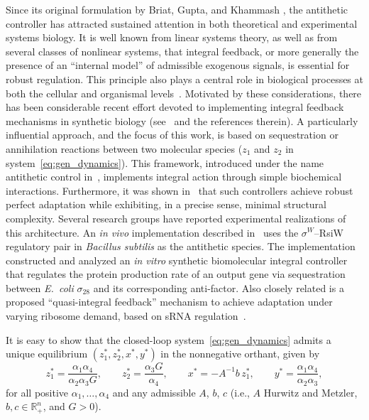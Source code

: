 \documentclass{article}
\begin{document}
Since its original formulation by Briat, Gupta, and Khammash \cite{AFC2016}, the antithetic controller has attracted sustained attention in both theoretical and experimental systems biology.
%
It is well known from linear systems theory, as well as from several classes of nonlinear systems, that integral feedback, or more generally the presence of an ``internal model'' of admissible exogenous signals, is essential for robust regulation. This principle also plays a central role in biological processes at both the cellular and organismal levels~\cite{rev_internal_model_2022}. Motivated by these considerations, there has been considerable recent effort devoted to 
implementing integral feedback mechanisms in synthetic biology (see~\cite{briat2025structuralstabilitypropertiesantithetic} and the references therein). A particularly influential approach, and the focus of this work, is based on sequestration or annihilation reactions between two molecular species ($z_1$ and $z_2$ in system~\eqref{eq:gen_dynamics}). This framework, introduced under the name antithetic control in~\cite{AFC2016}, implements integral action through simple biochemical interactions. Furthermore, it was shown in~\cite{Khammash2019} that such controllers achieve robust perfect adaptation 
while exhibiting, in a precise sense, minimal structural complexity.
%
Several research groups have reported experimental realizations of this architecture. An \emph{in vivo} implementation described in~\cite{Khammash2019} uses the $\sigma^W$--RsiW regulatory pair in \emph{Bacillus subtilis} as the antithetic species. The implementation~\cite{agarwal2019naturecom} constructed and analyzed an \emph{in vitro} synthetic biomolecular integral controller that regulates the protein production rate of an output gene via sequestration between 
\emph{E.\ coli} $\sigma_{28}$ and its corresponding anti-factor. Also closely related is a proposed ``quasi-integral feedback'' mechanism to achieve adaptation under varying ribosome demand, based on sRNA regulation~\cite{Huang2018}.

It is easy to show that the closed-loop system~\eqref{eq:gen_dynamics} admits a 
unique equilibrium $(z_1^*, z_2^*, x^*, y^*)$ in the nonnegative orthant, given by
\begin{equation*}
    z_1^* = \frac{\alpha_1\alpha_4}{\alpha_2\alpha_3 G}, \qquad
    z_2^* = \frac{\alpha_3 G}{\alpha_4}, \qquad
    x^* = -A^{-1}b\, z_1^*, \qquad
    y^* = \frac{\alpha_1\alpha_4}{\alpha_2\alpha_3},
\end{equation*}
for all positive $\alpha_1,\dots,\alpha_4$ and any admissible $A$, $b$, $c$ (i.e., $A$ Hurwitz and Metzler, $b,c\in\mathbb{R}^n_+$, and $G>0$).
\end{document}
